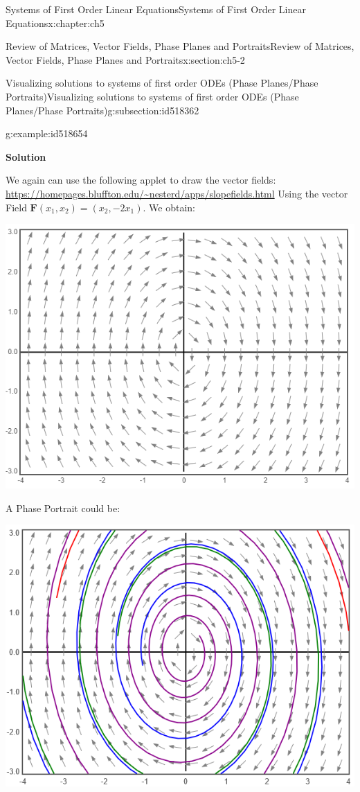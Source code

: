 \documentclass[oneside,10pt,]{book}
\newcommand{\terminology}[1]{\textbf{#1}}
\numberwithin{equation}{section}
\numberwithin{equation}{section}
\begin{document}
\begin{chapterptx}{Systems of First Order Linear Equations}{}{Systems of First Order Linear Equations}{}{}{x:chapter:ch5}
\begin{sectionptx}{Review of Matrices, Vector Fields, Phase Planes and Portraits}{}{Review of Matrices, Vector Fields, Phase Planes and Portraits}{}{}{x:section:ch5-2}
\begin{subsectionptx}{Visualizing solutions to systems of first order ODEs (Phase Planes\slash{}Phase Portraits)}{}{Visualizing solutions to systems of first order ODEs (Phase Planes\slash{}Phase Portraits)}{}{}{g:subsection:id518362}
\begin{example}{}{g:example:id518654}
\par
\terminology{Solution}%
\par
We again can use the following applet to draw the vector fields: \href{https://homepages.bluffton.edu/\~nesterd/apps/slopefields.html}{https:\slash{}\slash{}homepages.bluffton.edu\slash{}\textasciitilde{}nesterd\slash{}apps\slash{}slopefields.html} Using the vector Field \(\mathbf{F}(x_{1},x_{2})=\left(x_{2},-2x_{1}\right)\). We obtain: \begin{image}{0}{1}{0}%
\includegraphics[width=\linewidth]{images/5-VecField2.png}
\end{image}%
 A Phase Portrait could be: \begin{image}{0}{1}{0}%
\includegraphics[width=\linewidth]{images/5-VecField2b.png}

\end{image}
\end{example}
\end{subsectionptx}
\end{sectionptx}
\end{chapterptx}
\end{document}
